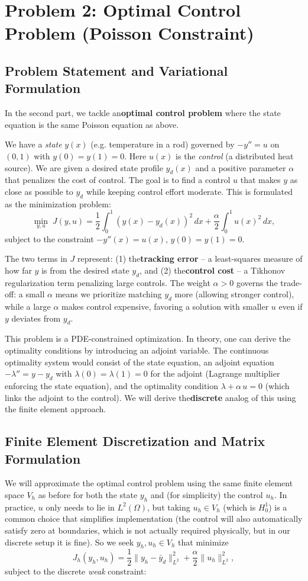 \documentclass[a4paper,10pt]{report}
\begin{document}
\section{Problem 2: Optimal Control Problem (Poisson Constraint)}

\subsection{Problem Statement and Variational Formulation}
In the second part, we tackle an\textbf{optimal control problem} where the state equation is the same Poisson equation as above.

We have a \emph{state} \(y(x)\) (e.g. temperature in a rod) governed by \(-y'' = u\) on \((0,1)\) with \(y(0)=y(1)=0\).
Here \(u(x)\) is the \emph{control} (a distributed heat source).
We are given a desired state profile \(y_d(x)\) and a positive parameter \(\alpha\) that penalizes the cost of control.
The goal is to find a control \(u\) that makes \(y\) as close as possible to \(y_d\) while keeping control effort moderate.
This is formulated as the minimization problem:
\[\min_{y,u} \; J(y,u) = \frac{1}{2}\int_0^1 (y(x) - y_d(x))^2\,dx + \frac{\alpha}{2}\int_0^1 u(x)^2\,dx,\]
subject to the constraint \(-y''(x) = u(x)\), \(y(0)=y(1)=0\).

The two terms in \(J\) represent: (1) the\textbf{tracking error} – a least-squares measure of how far \(y\) is from the desired state \(y_d\), and (2) the\textbf{control cost} – a Tikhonov regularization term penalizing large controls. The weight \(\alpha > 0\) governs the trade-off: a small \(\alpha\) means we prioritize matching \(y_d\) more (allowing stronger control), while a large \(\alpha\) makes control expensive, favoring a solution with smaller \(u\) even if \(y\) deviates from \(y_d\).

This problem is a PDE-constrained optimization. In theory, one can derive the optimality conditions by introducing an adjoint variable. The continuous optimality system would consist of the state equation, an adjoint equation \(-\lambda'' = y - y_d\) with \(\lambda(0)=\lambda(1)=0\) for the adjoint (Lagrange multiplier enforcing the state equation), and the optimality condition \(\lambda + \alpha\,u = 0\) (which links the adjoint to the control). We will derive the\textbf{discrete} analog of this using the finite element approach.

\subsection{Finite Element Discretization and Matrix Formulation}
We will approximate the optimal control problem using the same finite element space \(V_h\) as before for both the state \(y_h\) and (for simplicity) the control \(u_h\). In practice, \(u\) only needs to lie in \(L^2(\Omega)\), but taking \(u_h \in V_h\) (which is \(H^1_0\)) is a common choice that simplifies implementation (the control will also automatically satisfy zero at boundaries, which is not actually required physically, but in our discrete setup it is fine). So we seek \(y_h, u_h \in V_h\) that minimize
\[J_h(y_h, u_h) = \frac{1}{2}\|y_h - \bar{y}_d\|^2_{L^2} + \frac{\alpha}{2}\|u_h\|^2_{L^2},\]
subject to the discrete \emph{weak} constraint:
\end{document}
